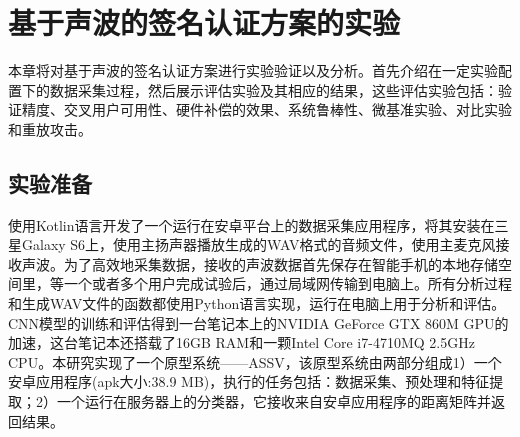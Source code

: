 \chapter{基于声波的签名认证方案的实验}
本章将对基于声波的签名认证方案进行实验验证以及分析。首先介绍在一定实验配置下的数据采集过程，然后展示评估实验及其相应的结果，这些评估实验包括：验证精度、交叉用户可用性、硬件补偿的效果、系统鲁棒性、微基准实验、对比实验和重放攻击。

\section{实验准备}
使用Kotlin语言开发了一个运行在安卓平台上的数据采集应用程序，将其安装在三星Galaxy S6上，使用主扬声器播放生成的WAV格式的音频文件，使用主麦克风接收声波。为了高效地采集数据，接收的声波数据首先保存在智能手机的本地存储空间里，等一个或者多个用户完成试验后，通过局域网传输到电脑上。所有分析过程和生成WAV文件的函数都使用Python语言实现，运行在电脑上用于分析和评估。CNN模型的训练和评估得到一台笔记本上的NVIDIA GeForce GTX 860M GPU的加速，这台笔记本还搭载了16GB RAM和一颗Intel Core i7-4710MQ 2.5GHz CPU。本研究实现了一个原型系统——ASSV，该原型系统由两部分组成1）一个安卓应用程序(apk大小:38.9 MB)，执行的任务包括：数据采集、预处理和特征提取；2）一个运行在服务器上的分类器，它接收来自安卓应用程序的距离矩阵并返回结果。

